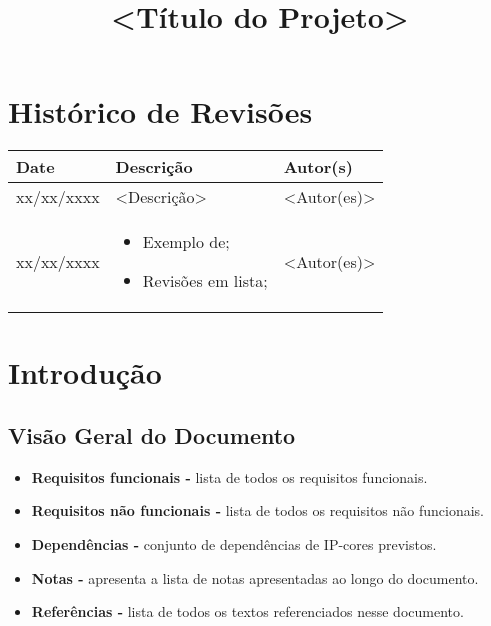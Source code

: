\documentclass{article}
\title{<Título do Projeto>}
\begin{document}
\newpage

\section*{\center Histórico de Revisões}
  \vspace*{1cm}
  \begin{table}[ht]
    \centering
    \begin{tabular}[pos]{|m{2cm} | m{7.2cm} | m{3.8cm}|} 
      \hline
      \cellcolor[gray]{0.9}
      \textbf{Date} & \cellcolor[gray]{0.9}\textbf{Descrição} & \cellcolor[gray]{0.9}\textbf{Autor(s)}\\ \hline
      \hline
      \small xx/xx/xxxx & \small <Descrição> & \small <Autor(es)> \\ \hline      
      \small xx/xx/xxxx &
      \begin{small}
        \begin{itemize}
          \item Exemplo de;
          \item Revisões em lista;
        \end{itemize}
      \end{small} & \small <Autor(es)> \\ \hline 
    \end{tabular}
  \end{table}

\newpage

\tableofcontents
\newpage

\section{Introdução}

\subsection{Visão Geral do Documento}
  \begin{itemize}
   \item \textbf{Requisitos funcionais -} lista de todos os requisitos funcionais.
   \item \textbf{Requisitos não funcionais -} lista de todos os requisitos não funcionais.
   \item \textbf{Dependências -} conjunto de dependências de IP-cores previstos.
   \item \textbf{Notas -} apresenta a lista de notas apresentadas ao longo do documento.
   \item \textbf{Referências -} lista de todos os textos referenciados nesse documento.
  \end{itemize}
\end{document}
